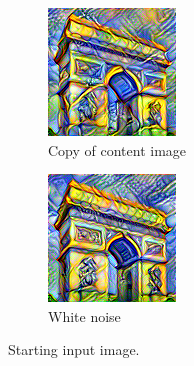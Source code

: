 \documentclass[twocolumn,superscriptaddress,aps,floatfix, nofootinbib]{revtex4-1}
\begin{document}
    \begin{figure}[ht]
        \centering
        \begin{subfigure}[b]{0.22\textwidth}
            \centering
            \includegraphics[width=\textwidth]{resources/png/inputs/sun-trees-paris-copy.png}
            \caption{Copy of content image}
        \end{subfigure}
        \hfill
        \begin{subfigure}[b]{0.22\textwidth}
            \centering
            \includegraphics[width=\textwidth]{resources/png/inputs/sun-trees-paris-noisy.png}
            \caption{White noise}
        \end{subfigure}
        \caption{Starting input image.}
        \label{fig:input.image.variations}
    \end{figure}
    
\end{document}
